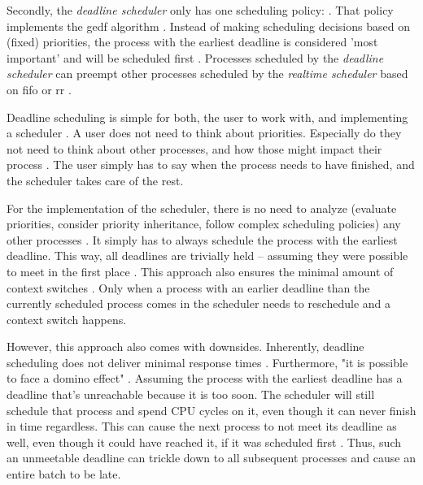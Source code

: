 \documentclass[10pt,twocolumn,a4paper]{article}
\begin{document}
Secondly, the \emph{deadline scheduler} only has one scheduling policy:  \cite{bristot_de_oliveira_deadline_2018}.
That policy implements the \acrfull{gedf} algorithm \cite{lelli_deadline_2016}.
Instead of making scheduling decisions based on (fixed) priorities, the process with the earliest deadline is considered 'most important' and will be scheduled first \cite{bristot_de_oliveira_deadline_2018}.
Processes scheduled by the \emph{deadline scheduler} can preempt other processes scheduled by the \emph{realtime scheduler} based on \acrshort{fifo} or \acrshort{rr} \cite{lf:scheduler}.

Deadline scheduling is simple for both, the user to work with, and implementing a scheduler \cite{bristot_de_oliveira_deadline_2018}.
A user does not need to think about priorities.
Especially do they not need to think about other processes, and how those might impact their process \cite{bristot_de_oliveira_deadline_2018}.
The user simply has to say when the process needs to have finished, and the scheduler takes care of the rest.

For the implementation of the scheduler, there is no need to analyze (evaluate priorities, consider priority inheritance, follow complex scheduling policies) any other processes \cite{bristot_de_oliveira_deadline_2018}.
It simply has to always schedule the process with the earliest deadline.
This way, all deadlines are trivially held -- assuming they were possible to meet in the first place \cite{bristot_de_oliveira_deadline_2018}.
This approach also ensures the minimal amount of context switches \cite{bristot_de_oliveira_deadline_2018}.
Only when a process with an earlier deadline than the currently scheduled process comes in the scheduler needs to reschedule and a context switch happens.

However, this approach also comes with downsides.
Inherently, deadline scheduling does not deliver minimal response times \cite{bristot_de_oliveira_deadline_2018}.
Furthermore, "it is possible to face a domino effect" \cite{bristot_de_oliveira_deadline_2018}.
Assuming the process with the earliest deadline has a deadline that's unreachable because it is too soon.
The scheduler will still schedule that process and spend CPU cycles on it, even though it can never finish in time regardless.
This can cause the next process to not meet its deadline as well, even though it could have reached it, if it was scheduled first \cite{bristot_de_oliveira_deadline_2018}.
Thus, such an unmeetable deadline can trickle down to all subsequent processes and cause an entire batch to be late.
\end{document}
